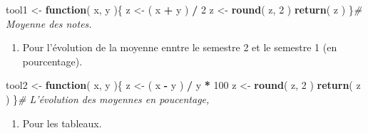 \documentclass[
  11pt,
  french,
]{article}
\newenvironment{Shaded}{\begin{snugshade}}{\end{snugshade}}
\newcommand{\CommentTok}[1]{\textcolor[rgb]{0.56,0.35,0.01}{\textit{#1}}}
\newcommand{\ControlFlowTok}[1]{\textcolor[rgb]{0.13,0.29,0.53}{\textbf{#1}}}
\newcommand{\DataTypeTok}[1]{\textcolor[rgb]{0.13,0.29,0.53}{#1}}
\newcommand{\DecValTok}[1]{\textcolor[rgb]{0.00,0.00,0.81}{#1}}
\newcommand{\KeywordTok}[1]{\textcolor[rgb]{0.13,0.29,0.53}{\textbf{#1}}}
\newcommand{\NormalTok}[1]{#1}
\newcommand{\OperatorTok}[1]{\textcolor[rgb]{0.81,0.36,0.00}{\textbf{#1}}}
\newcommand{\StringTok}[1]{\textcolor[rgb]{0.31,0.60,0.02}{#1}}
\providecommand{\tightlist}{%
  \setlength{\itemsep}{0pt}\setlength{\parskip}{0pt}}
\begin{document}
\begin{Shaded}
\begin{Highlighting}[]
\NormalTok{tool1 <-}\StringTok{ }\ControlFlowTok{function}\NormalTok{( x, y )\{}
\NormalTok{  z <-}\StringTok{ }\NormalTok{( x }\OperatorTok{+}\StringTok{ }\NormalTok{y ) }\OperatorTok{/}\StringTok{ }\DecValTok{2}
\NormalTok{  z <-}\StringTok{ }\KeywordTok{round}\NormalTok{( z,}
              \DecValTok{2}\NormalTok{ )}
  \KeywordTok{return}\NormalTok{( z )}
\NormalTok{\}}\CommentTok{# Moyenne des notes.}
\end{Highlighting}
\end{Shaded}

\begin{enumerate}
\def\labelenumi{\arabic{enumi}.}
\setcounter{enumi}{1}
\tightlist
\item
  Pour l'évolution de la moyenne enntre le semestre 2 et le semestre 1
  (en pourcentage).
\end{enumerate}

\begin{Shaded}
\begin{Highlighting}[]
\NormalTok{tool2 <-}\StringTok{ }\ControlFlowTok{function}\NormalTok{( x, y )\{}
\NormalTok{  z <-}\StringTok{ }\NormalTok{( x }\OperatorTok{-}\StringTok{ }\NormalTok{y ) }\OperatorTok{/}\StringTok{ }\NormalTok{y }\OperatorTok{*}\StringTok{ }\DecValTok{100}
\NormalTok{  z <-}\StringTok{ }\KeywordTok{round}\NormalTok{( z,}
              \DecValTok{2}\NormalTok{ )}
  \KeywordTok{return}\NormalTok{( z )}
\NormalTok{\}}\CommentTok{# L'évolution des moyennes en poucentage,}
\end{Highlighting}
\end{Shaded}

\begin{enumerate}
\def\labelenumi{\arabic{enumi}.}
\setcounter{enumi}{2}
\tightlist
\item
  Pour les tableaux.
\end{enumerate}

\begin{Shaded}
\end{Shaded}
\end{document}
